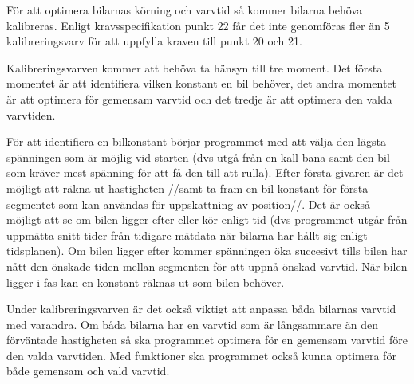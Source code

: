 För att optimera bilarnas körning och varvtid så kommer bilarna behöva
kalibreras. Enligt kravsspecifikation punkt 22 får det inte genomföras fler än
5 kalibreringsvarv för att uppfylla kraven till punkt 20 och 21.

Kalibreringsvarven kommer att behöva ta hänsyn till tre moment. Det första momentet är att
identifiera vilken konstant en bil behöver, det andra momentet är att optimera för
gemensam varvtid och det tredje är att optimera den valda varvtiden.


För att identifiera en bilkonstant börjar programmet med att välja den lägsta spänningen som är möjlig vid starten (dvs utgå från en kall bana samt den bil som kräver mest spänning för att få den till att rulla). Efter första givaren är det möjligt att räkna ut hastigheten //samt ta fram en bil-konstant för första segmentet som kan användas för uppskattning av position//. Det är också möjligt att se om bilen ligger efter eller kör enligt tid (dvs programmet utgår från uppmätta snitt-tider från tidigare mätdata när bilarna har hållt sig enligt tidsplanen). Om bilen ligger efter kommer spänningen öka succesivt tills bilen har nått den önskade tiden mellan segmenten för att uppnå önskad varvtid. När bilen ligger i fas kan en konstant räknas ut som bilen behöver. 

Under
kalibreringsvarven är det också viktigt att anpassa båda bilarnas varvtid med
varandra. Om båda bilarna har en varvtid som är långsammare än den förväntade
hastigheten så ska programmet optimera för en gemensam varvtid före den valda
varvtiden. Med funktioner ska programmet också kunna optimera för både
gemensam och vald varvtid.

